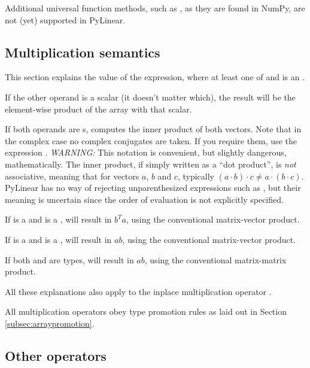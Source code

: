 Additional universal function methods, such as , as they are
found in NumPy, are not (yet) supported in PyLinear.

\subsection{Multiplication semantics}
\label{subsec:arraymultiplication}

This section explains the value of the expression, where at
least one of  and  is an .

If the other operand is a scalar (it doesn't matter which), the
result will be the element-wise product of the array with that scalar.

If both operands are s,  computes the inner
product of both vectors. Note that in the complex case no complex
conjugates are taken. If you require them, use the expression
. \emph{WARNING:} This notation is convenient, but
slightly dangerous, mathematically. The inner product, if simply
written as a ``dot product'', is \emph{not} associative, meaning that
for vectors $a$, $b$ and $c$, typically $(a\cdot b)\cdot
c\not=a\cdot(b\cdot c)$.  PyLinear has no way of rejecting
unparenthesized expressions such as , but their meaning is
uncertain since the order of evaluation is not explicitly specified.

If  is a  and  is a ,
 will result in $b^Ta$, using the conventional matrix-vector
product.

If  is a  and  is a ,
 will result in $a b$, using the conventional matrix-vector
product.

If both  and  are  types,
 will result in $a b$, using the conventional matrix-matrix
product.

All these explanations also apply to the inplace multiplication
operator \code{*=}.

All multiplication operators obey type promotion rules as laid out
in Section \ref{subsec:arraypromotion}.

\subsection{Other  operators}


